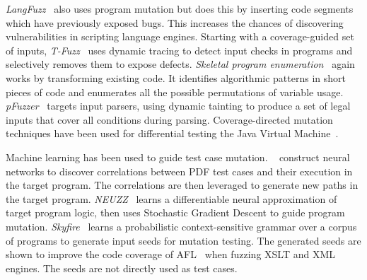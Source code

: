\emph{LangFuzz}~\cite{Holler2012} also uses program mutation but does this by inserting code segments which have previously exposed bugs. This increases the chances of discovering vulnerabilities in scripting language engines.
Starting with a coverage-guided set of inputs, \emph{T-Fuzz}~\cite{Peng2018} uses dynamic tracing to detect input checks in programs and selectively removes them to expose defects.
\emph{Skeletal program enumeration}~\cite{Zhang2017a} again works by transforming existing code. It identifies algorithmic patterns in short pieces of code and enumerates all the possible permutations of variable usage.
\emph{pFuzzer}~\cite{Mathis2019} targets input parsers, using dynamic tainting to produce a set of legal inputs that cover all conditions during parsing.
Coverage-directed mutation techniques have been used for differential testing the Java Virtual Machine~\cite{Chen2016b}.

Machine learning has been used to guide test case mutation.
\citeauthor{Cheng2019}~\cite{Cheng2019} construct neural networks to discover correlations between PDF test cases and their execution in the target program. The correlations are then leveraged to generate new paths in the target program.
\emph{NEUZZ}~\cite{She2018} learns a differentiable neural approximation of target program logic, then uses Stochastic Gradient Descent to guide program mutation.
\emph{Skyfire}~\cite{Wang2017c} learns a probabilistic context-sensitive grammar over a corpus of programs to generate input seeds for mutation testing. The generated seeds are shown to improve the code coverage of AFL~\cite{Zalewski} when fuzzing XSLT and XML engines. The seeds are not directly used as test cases.

